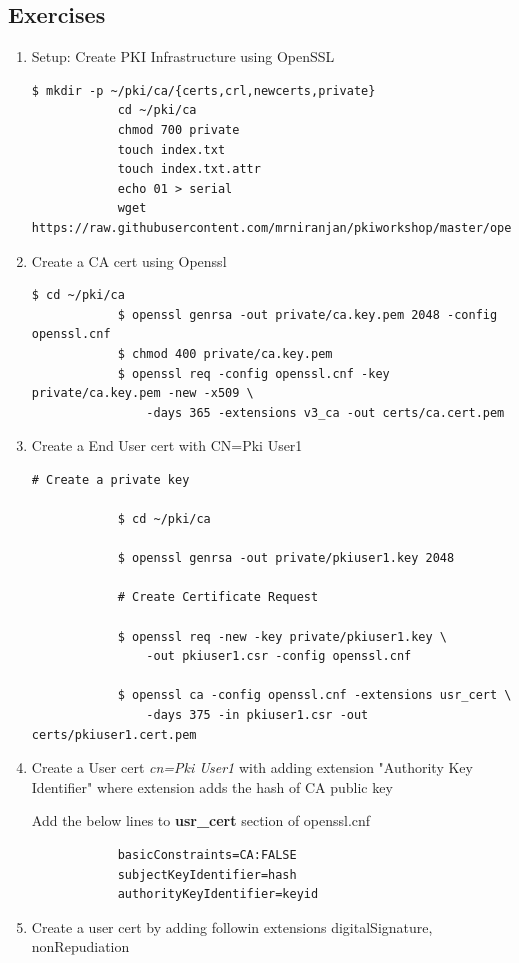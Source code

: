 \documentclass[a4paper]{article}
\begin{document}
\subsection{Exercises}
\begin{enumerate}[label*=\arabic*.]
    \item Setup: Create PKI Infrastructure using OpenSSL
        \begin{lstlisting}[style=BashInputStyle]
            $ mkdir -p ~/pki/ca/{certs,crl,newcerts,private}
            cd ~/pki/ca
            chmod 700 private
            touch index.txt
            touch index.txt.attr
            echo 01 > serial
            wget https://raw.githubusercontent.com/mrniranjan/pkiworkshop/master/openssl.cnf
        \end{lstlisting}
    \item Create a CA cert using Openssl
        \begin{lstlisting}[style=BashInputStyle]
            $ cd ~/pki/ca
            $ openssl genrsa -out private/ca.key.pem 2048 -config openssl.cnf
            $ chmod 400 private/ca.key.pem
            $ openssl req -config openssl.cnf -key private/ca.key.pem -new -x509 \
                -days 365 -extensions v3_ca -out certs/ca.cert.pem
        \end{lstlisting}
    \item Create a End User cert with CN=Pki User1
        \begin{lstlisting}[style=BashInputStyle]
            # Create a private key
            
            $ cd ~/pki/ca
            
            $ openssl genrsa -out private/pkiuser1.key 2048
            
            # Create Certificate Request

            $ openssl req -new -key private/pkiuser1.key \
                -out pkiuser1.csr -config openssl.cnf
            
            $ openssl ca -config openssl.cnf -extensions usr_cert \
                -days 375 -in pkiuser1.csr -out certs/pkiuser1.cert.pem
        \end{lstlisting}
    \item Create a User cert \textit{cn=Pki User1} with adding extension "Authority Key Identifier" where 
        extension adds the hash of CA public key

        Add the below lines to \textbf{usr\_cert} section of openssl.cnf
        \begin{lstlisting}
            basicConstraints=CA:FALSE
            subjectKeyIdentifier=hash
            authorityKeyIdentifier=keyid
        \end{lstlisting}
    \item Create a user cert by adding followin extensions digitalSignature, nonRepudiation


\end{enumerate}
\end{document}
